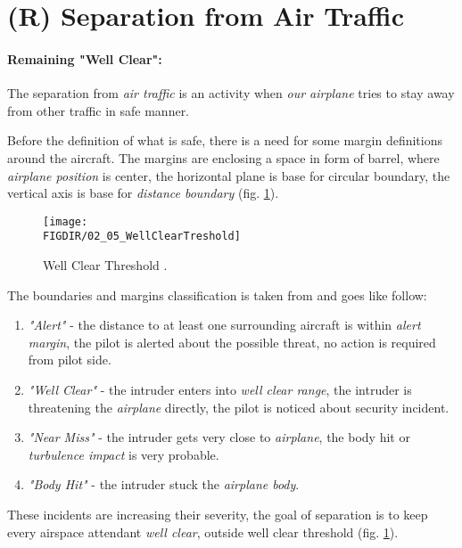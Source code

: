 \newpage
\section{(R) Separation from Air Traffic}\label{sec:WellClear}

\paragraph{Remaining "Well Clear":} The separation from \emph{air traffic} is an activity when \emph{our airplane} tries to stay away from other traffic in safe manner.  

Before the definition of what is safe, there is a need for some margin definitions around the aircraft. The margins are enclosing a space in form of barrel, where \emph{airplane position} is center, the horizontal plane is base for circular boundary, the vertical axis is base for \emph{distance boundary} (fig. \ref{fig:WellClearTreshold}).

\begin{figure}[H]
    \centering
    \texttt{[image: \\FIGDIR/02\_05\_WellClearTreshold]}
    \caption{Well Clear Threshold \cite{valavanis2015uav,united1983pilots}.}
    \label{fig:WellClearTreshold}
\end{figure}

\noindent The boundaries and margins classification is taken from \cite{united1983pilots,valavanis2015uav} and goes like follow:

\begin{enumerate}
    \item \emph{"Alert"} - the distance to at least one surrounding aircraft is within \emph{alert margin}, the pilot is alerted about the possible threat, no action is required from pilot side.
    
    \item \emph{"Well Clear"} - the intruder enters into \emph{well clear range}, the intruder is threatening the \emph{airplane} directly, the pilot is noticed about security incident.
    
    \item \emph{"Near Miss"} - the intruder gets very close to \emph{airplane}, the body hit or \emph{turbulence impact} is very probable. 
    
    \item \emph{"Body Hit"} - the intruder stuck the \emph{airplane body}.
\end{enumerate}

\noindent These incidents are increasing their severity, the goal of separation is to keep every airspace attendant \emph{well clear}, outside well clear threshold (fig. \ref{fig:WellClearTreshold}). 
